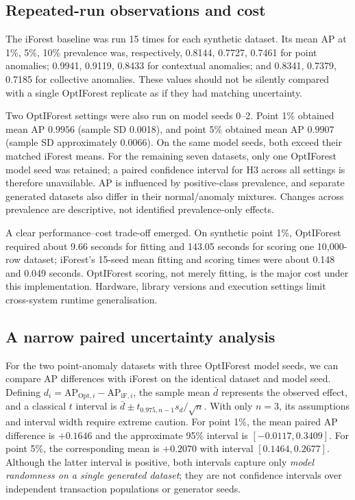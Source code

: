 \documentclass[11pt]{article}
\newcommand{\ap}{\mathrm{AP}}
\begin{document}
\subsection{Repeated-run observations and cost}
The iForest baseline was run 15 times for each synthetic dataset. Its mean AP at 1\%, 5\%, 10\% prevalence was, respectively, 0.8144, 0.7727, 0.7461 for point anomalies; 0.9941, 0.9119, 0.8433 for contextual anomalies; and 0.8341, 0.7379, 0.7185 for collective anomalies. These values should not be silently compared with a single OptIForest replicate as if they had matching uncertainty.
 
Two OptIForest settings were also run on model seeds 0--2. Point 1\% obtained mean AP $0.9956$ (sample SD 0.0018), and point 5\% obtained mean AP $0.9907$ (sample SD approximately 0.0066). On the same model seeds, both exceed their matched iForest means. For the remaining seven datasets, only one OptIForest model seed was retained; a paired confidence interval for H3 across all settings is therefore unavailable. AP is influenced by positive-class prevalence, and separate generated datasets also differ in their normal/anomaly mixtures. Changes across prevalence are descriptive, not identified prevalence-only effects.
 
A clear performance--cost trade-off emerged. On synthetic point 1\%, OptIForest required about 9.66 seconds for fitting and 143.05 seconds for scoring one 10,000-row dataset; iForest's 15-seed mean fitting and scoring times were about 0.148 and 0.049 seconds. OptIForest scoring, not merely fitting, is the major cost under this implementation. Hardware, library versions and execution settings limit cross-system runtime generalisation.
 
 
\subsection{A narrow paired uncertainty analysis}
For the two point-anomaly datasets with three OptIForest model seeds, we can compare AP differences with iForest on the identical dataset and model seed. Defining $d_i=\ap_{\mathrm{Opt},i}-\ap_{\mathrm{iF},i}$, the sample mean $\bar d$ represents the observed effect, and a classical $t$ interval is $\bar d\pm t_{0.975,n-1}s_d/\sqrt{n}$. With only $n=3$, its assumptions and interval width require extreme caution. For point 1\%, the mean paired AP difference is $+0.1646$ and the approximate 95\% interval is $[-0.0117,0.3409]$. For point 5\%, the corresponding mean is $+0.2070$ with interval $[0.1464,0.2677]$. Although the latter interval is positive, both intervals capture only \emph{model randomness on a single generated dataset}; they are not confidence intervals over independent transaction populations or generator seeds.
 
\end{document}
